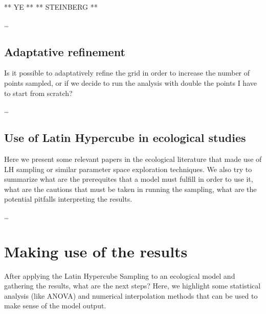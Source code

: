 \documentclass[12pt,a4paper]{article}
\begin{document}
** YE **
** STEINBERG **


\dots

\subsection{Adaptative refinement}
Is it possible to adaptatively refine the grid in order to increase the number of points sampled, or if we decide to run
the analysis with double the points I have to start from scratch?

\dots

\subsection{Use of Latin Hypercube in ecological studies}
Here we present some relevant papers in the ecological literature that made use of LH sampling or similar parameter space
exploration techniques. We also try to summarize what are the prerequites that a model must fulfill in order to use it, 
what are the cautions that must be taken in running the sampling, what are the potential pitfalls interpreting the results.

\dots

\section{Making use of the results}
After applying the Latin Hypercube Sampling to an ecological model and gathering the results, what are the next steps? Here, we 
highlight some statistical analysis (like ANOVA) and numerical interpolation methods that can be used to make sense of the model
output.


\end{document}

